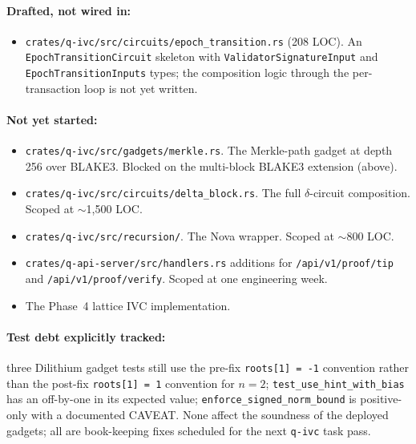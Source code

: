 \documentclass[11pt,a4paper]{article}
\begin{document}
\paragraph{Drafted, not wired in:}
\begin{itemize}[leftmargin=*]
  \item \texttt{crates/q-ivc/src/circuits/epoch\_transition.rs} (208 LOC).
        An \texttt{EpochTransitionCircuit} skeleton with
        \texttt{ValidatorSignatureInput} and
        \texttt{EpochTransitionInputs} types; the composition logic
        through the per-transaction loop is not yet written.
\end{itemize}

\paragraph{Not yet started:}
\begin{itemize}[leftmargin=*]
  \item \texttt{crates/q-ivc/src/gadgets/merkle.rs}. The Merkle-path
        gadget at depth 256 over BLAKE3. Blocked on the multi-block
        BLAKE3 extension (above).
  \item \texttt{crates/q-ivc/src/circuits/delta\_block.rs}. The full
        $\delta$-circuit composition. Scoped at $\sim$1{,}500 LOC.
  \item \texttt{crates/q-ivc/src/recursion/}. The Nova wrapper.
        Scoped at $\sim$800 LOC.
  \item \texttt{crates/q-api-server/src/handlers.rs} additions for
        \texttt{/api/v1/proof/tip} and \texttt{/api/v1/proof/verify}.
        Scoped at one engineering week.
  \item The Phase~4 lattice IVC implementation.
\end{itemize}

\paragraph{Test debt explicitly tracked:} three Dilithium gadget tests
still use the pre-fix \texttt{roots[1] = -1} convention rather than the
post-fix \texttt{roots[1] = 1} convention for $n = 2$;
\texttt{test\_use\_hint\_with\_bias} has an off-by-one in its
expected value; \texttt{enforce\_signed\_norm\_bound} is positive-only
with a documented CAVEAT. None affect the soundness of the deployed
gadgets; all are book-keeping fixes scheduled for the next
\texttt{q-ivc} task pass.

\end{document}
